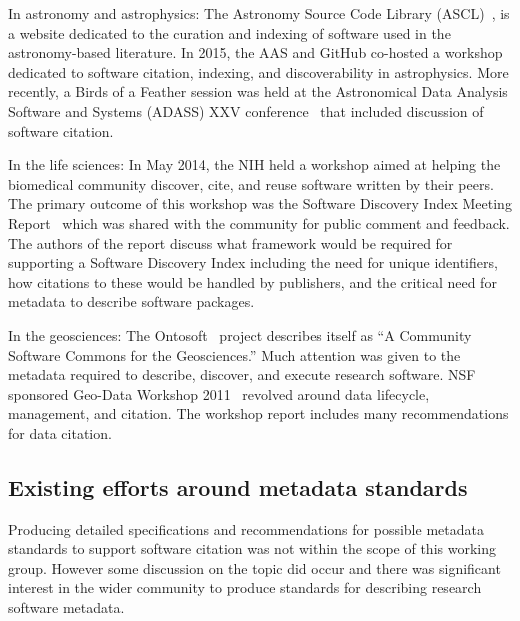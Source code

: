 \documentclass[11pt, oneside]{amsart}
\begin{document}
In astronomy and astrophysics: The Astronomy Source Code Library
(ASCL)~\cite{ascl}, is a website dedicated to the curation and indexing of
software used in the astronomy-based literature. In 2015, the AAS and GitHub
co-hosted a workshop~\cite{aas-software-index} dedicated to software citation,
indexing, and discoverability in astrophysics. More recently, a Birds of a Feather session was
held at the Astronomical Data Analysis Software and Systems (ADASS) XXV
conference~\cite{2015arXiv151207919A} that included discussion of software
citation.

In the life sciences: In May 2014, the NIH held a workshop aimed at helping the
biomedical community discover, cite, and reuse software written by their peers.
The primary outcome of this workshop was the Software Discovery Index Meeting
Report~\cite{software-discovery-index} which was shared with the community for
public comment and feedback. The authors of the report discuss
what framework would be required for supporting a Software Discovery Index
including the need for unique identifiers, how citations to these would be
handled by publishers, and the critical need for metadata to describe software
packages.

In the geosciences: The Ontosoft~\cite{ontosoft} project describes itself as ``A
Community Software Commons for the Geosciences.'' Much attention was given to the
metadata required to describe, discover, and execute research software. NSF sponsored
Geo-Data Workshop 2011~\cite{nsf-geo-data} revolved around data lifecycle, management, and
citation. The workshop report includes many recommendations for data
citation.

\subsection{Existing efforts around metadata standards}

Producing detailed specifications and recommendations for possible metadata
standards to support software citation was not within the scope of this working
group. However some discussion on the topic did occur and there was significant
interest in the wider community to produce standards for describing research
software metadata.
\end{document}
